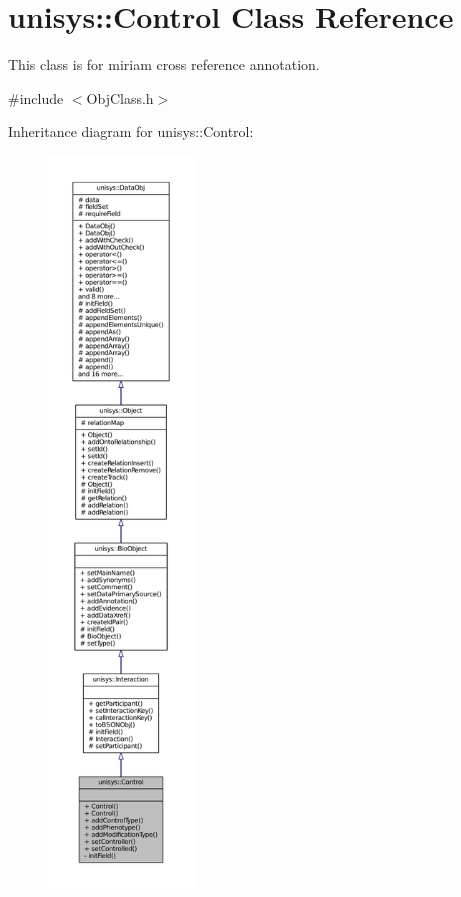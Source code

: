 \hypertarget{classunisys_1_1Control}{\section{unisys\-:\-:Control Class Reference}
\label{classunisys_1_1Control}
}


This class is for miriam cross reference annotation.  




{\ttfamily \#include $<$Obj\-Class.\-h$>$}



Inheritance diagram for unisys\-:\-:Control\-:
\nopagebreak
\begin{figure}[H]
\begin{center}
\leavevmode
\includegraphics[height=550pt]{classunisys_1_1Control__inherit__graph}
\end{center}
\end{figure}


